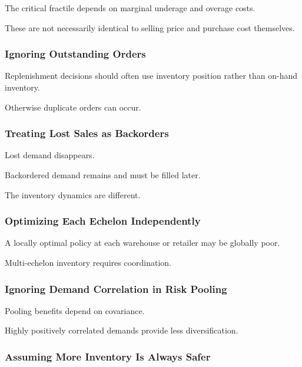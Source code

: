 The critical fractile depends on marginal underage and overage costs.

These are not necessarily identical to selling price and purchase cost
themselves.

\subsubsection{Ignoring Outstanding Orders}

Replenishment decisions should often use inventory position rather than
on-hand inventory.

Otherwise duplicate orders can occur.

\subsubsection{Treating Lost Sales as Backorders}

Lost demand disappears.

Backordered demand remains and must be filled later.

The inventory dynamics are different.

\subsubsection{Optimizing Each Echelon Independently}

A locally optimal policy at each warehouse or retailer may be globally
poor.

Multi-echelon inventory requires coordination.

\subsubsection{Ignoring Demand Correlation in Risk Pooling}

Pooling benefits depend on covariance.

Highly positively correlated demands provide less diversification.

\subsubsection{Assuming More Inventory Is Always Safer}

